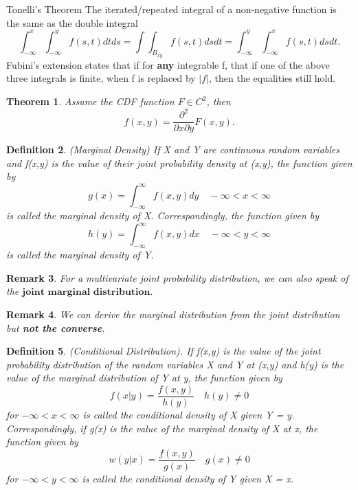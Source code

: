 \documentclass[twoside]{article}
\newcounter{lecnum}
\newtheorem{theorem}{Theorem}[lecnum]
\newtheorem{definition}[theorem]{Definition}
\newtheorem{remark}[theorem]{Remark}
\begin{document}
\begin{theorem_exam}{Tonelli's Theorem}{} The iterated/repeated integral of a non-negative function is the same as the double integral 
$$
\int_{-\infty}^x\int_{-\infty}^yf(s,t)dtds = \int\int_{B_{xy}}f(s,t)dsdt = \int_{-\infty}^{y}\int_{-\infty}^{x}f(s,t)dsdt.
$$
Fubini's extension states that if for \textbf{any} integrable f, that if one of the above three integrals is finite, when f is replaced by $|f|$, then the equalities still hold.
\end{theorem_exam}

\begin{theorem}Assume the CDF function $F \in C^2$, then 
$$
f(x,y) = \frac{\partial^2}{\partial x \partial y}F(x,y).
$$
\end{theorem}

\begin{definition}(Marginal Density) If X and Y are continuous random variables and f(x,y) is the value of their joint probability density at (x,y), the function given by 
$$
g(x) = \int_{-\infty}^{\infty}f(x,y)dy \quad -\infty < x < \infty
$$
is called the marginal density of X. Correspondingly, the function given by 
$$
h(y) = \int_{-\infty}^{\infty}f(x,y)dx \quad -\infty < y < \infty
$$
is called the marginal density of Y.
\end{definition}

\begin{remark}For a multivariate joint probability distribution, we can also speak of the $\textbf{joint marginal distribution}.$
\end{remark}

\begin{remark}We can derive the marginal distribution from the joint distribution but \textbf{not the converse}.
\end{remark}

\begin{definition}(Conditional Distribution). If f(x,y) is the value of the joint probability distribution of the random variables X and Y at (x,y) and h(y) is the value of the marginal distribution of Y at y, the function given by 
$$
f(x|y) = \frac{f(x,y)}{h(y)} \quad h(y) \neq 0
$$
for $-\infty < x < \infty$ is called the conditional density of X given Y = y. Correspondingly, if g(x) is the value of the marginal density of X at x, the function given by 
$$
w(y|x) = \frac{f(x,y)}{g(x)} \quad g(x) \neq 0
$$
for $- \infty < y < \infty$ is called the conditional density of Y given X = x.
\end{definition}
\end{document}
